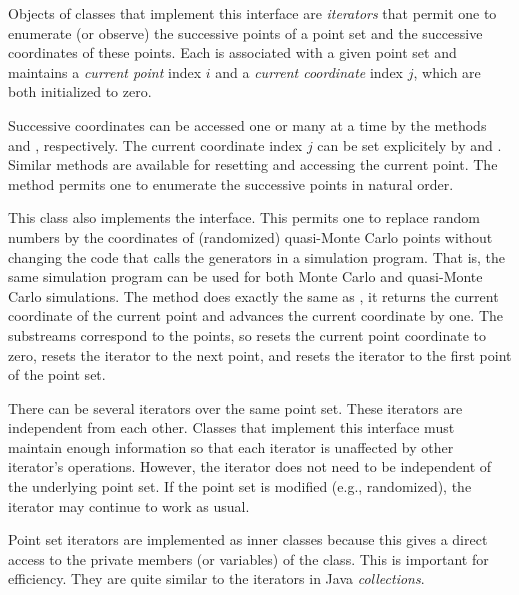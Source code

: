 
Objects of classes that implement this interface are \emph{iterators} 
that permit one to enumerate
(or observe) the successive points of a point set and the successive 
coordinates of these points.
Each  is associated with a given point set
and maintains a \emph{current point} index $i$ and a \emph{current coordinate}
index $j$, which are both initialized to zero.

Successive coordinates can be accessed one or many at a time by the methods
 and , respectively.
The current coordinate index $j$ can be set explicitely by
 and . 
Similar methods are available for resetting and accessing the current point.
The method  permits one to 
enumerate the successive points in natural order. 

This class also implements the  interface.
This permits one to replace random numbers by the coordinates of
(randomized) quasi-Monte Carlo points without changing the code that calls
the generators in a simulation program.
That is, the same simulation program can be used for both Monte Carlo 
and quasi-Monte Carlo simulations.
The method  does exactly the same as 
, it returns the current coordinate of the 
current point and advances the current coordinate by one.  
The substreams correspond to the points, so  
 resets the current point coordinate to zero, 
 resets the iterator to the next point, and
 resets the iterator to the first point of 
the point set.

There can be several iterators over the same point set.
These iterators are independent from each other.  
Classes that implement this interface must maintain enough information 
so that each iterator is unaffected by other iterator's operations.
However, the iterator does not need to be independent of the underlying 
point set.  If the point set is modified (e.g., randomized), the iterator
may continue to work as usual.

Point set iterators are implemented as inner classes because
this gives a direct access to the private members (or variables) 
of the class.  This is important for efficiency.
They are quite similar to the iterators in Java \emph{collections}.

